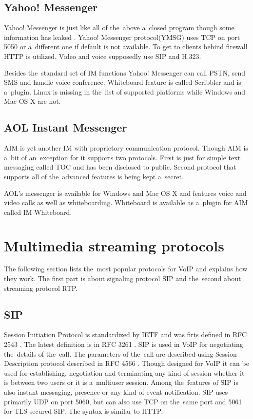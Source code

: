 \subsection*{Yahoo! Messenger}
Yahoo! Messenger is just like all of the~above a~closed program though some information has leaked \cite{wikipediaYahoo}. Yahoo! Messenger protocol(YMSG) uses TCP on port 5050 or a~different one if default is not available. To get to clients behind firewall HTTP is utilized. Video and voice supposedly use SIP and H.323.

Besides the~standard set of IM functions Yahoo! Messenger can call PSTN, send SMS and handle voice conference. Whiteboard feature is called Scribbler and is a~plugin. Linux is missing in the~list of supported platforms while Windows and Mac OS X are not.

\subsection*{AOL Instant Messenger}
AIM is yet another IM with proprietory communication protocol. Though AIM is a~bit of an~exception for it supports two protocols. First is just for simple text messaging called TOC and has been disclosed to public. Second protocol that supports all of the~advanced features is being kept a~secret.

AOL's messenger is available for Windows and Mac OS X and features voice and video calls as well as whiteboarding. Whiteboard is available as a~plugin for AIM called IM Whiteboard. 

\section{Multimedia streaming protocols}
The following section lists the~most popular protocols for VoIP and explains how they work. The first part is about signaling protocol SIP and the~second about streaming protocol RTP.

\subsection*{SIP}
Session Initiation Protocol is standardized by IETF and was firts defined in RFC 2543 \cite{sipRFC}. The latest definition is in RFC 3261 \cite{sipRFC2}. SIP is used in VoIP for negotiating the~details of the~call. The parameters of the~call are described using Session Description protocol described in RFC 4566 \cite{sdpRFC}. Though designed for VoIP it can be used for establishing, negotiation and  terminating any kind of session whether it is between two users or it is a~multiuser session. Among the~features of SIP is also instant messaging, presence or any kind of event notification. SIP uses primarily UDP on port 5060, but can also use TCP on the~same port and 5061 for TLS secured SIP. The syntax is similar to HTTP.

